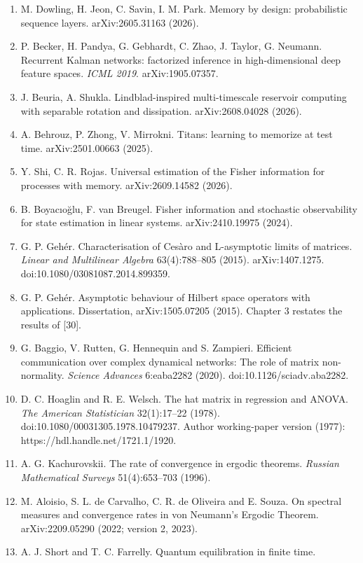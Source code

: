 \documentclass[
  10pt,
]{article}
\begin{document}
\begin{enumerate}
\item
  M. Dowling, H. Jeon, C. Savin, I. M. Park. Memory by design:
  probabilistic sequence layers. arXiv:2605.31163 (2026).
\item
  P. Becker, H. Pandya, G. Gebhardt, C. Zhao, J. Taylor, G. Neumann.
  Recurrent Kalman networks: factorized inference in high-dimensional
  deep feature spaces. \emph{ICML 2019}. arXiv:1905.07357.
\item
  J. Beuria, A. Shukla. Lindblad-inspired multi-timescale reservoir
  computing with separable rotation and dissipation. arXiv:2608.04028
  (2026).
\item
  A. Behrouz, P. Zhong, V. Mirrokni. Titans: learning to memorize at
  test time. arXiv:2501.00663 (2025).
\item
  Y. Shi, C. R. Rojas. Universal estimation of the Fisher information
  for processes with memory. arXiv:2609.14582 (2026).
\item
  B. Boyacıoğlu, F. van Breugel. Fisher information and stochastic
  observability for state estimation in linear systems. arXiv:2410.19975
  (2024).
\item
  G. P. Gehér. Characterisation of Cesàro and L-asymptotic limits of
  matrices. \emph{Linear and Multilinear Algebra} 63(4):788--805 (2015).
  arXiv:1407.1275. doi:10.1080/03081087.2014.899359.
\item
  G. P. Gehér. Asymptotic behaviour of Hilbert space operators with
  applications. Dissertation, arXiv:1505.07205 (2015). Chapter 3
  restates the results of {[}30{]}.
\item
  G. Baggio, V. Rutten, G. Hennequin and S. Zampieri. Efficient
  communication over complex dynamical networks: The role of matrix
  non-normality. \emph{Science Advances} 6:eaba2282 (2020).
  doi:10.1126/sciadv.aba2282.
\item
  D. C. Hoaglin and R. E. Welsch. The hat matrix in regression and
  ANOVA. \emph{The American Statistician} 32(1):17--22 (1978).
  doi:10.1080/00031305.1978.10479237. Author working-paper version
  (1977): https://hdl.handle.net/1721.1/1920.
\item
  A. G. Kachurovskii. The rate of convergence in ergodic theorems.
  \emph{Russian Mathematical Surveys} 51(4):653--703 (1996).
\item
  M. Aloisio, S. L. de Carvalho, C. R. de Oliveira and E. Souza. On
  spectral measures and convergence rates in von Neumann's Ergodic
  Theorem. arXiv:2209.05290 (2022; version 2, 2023).
\item
  A. J. Short and T. C. Farrelly. Quantum equilibration in finite time.

\end{enumerate}
\end{document}
